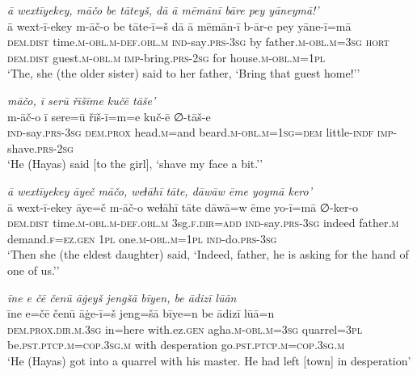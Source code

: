 \ea \label{ŽH.50}
\textit{ā wextīyekey, māčo be tāteyš, dā ā mēmānī bāre pey yāneymā!’} \\ 
\gll ā wext-ī-ekey m-āč-o be tāte-ī=š dā ā mēmān-ī b-ār-e pey yāne-ī=mā \\ 
 \textsc{dem.dist} time\textsc{.m}\textsc{-obl}\textsc{.m}\textsc{-def}\textsc{.obl}\textsc{.m} \textsc{ind-}say\textsc{.prs}\textsc{-3sg} by father\textsc{.m}\textsc{-obl}\textsc{.m}\textsc{=3sg} \textsc{hort} \textsc{dem.dist} guest\textsc{.m}\textsc{-obl}\textsc{.m} \textsc{imp-}bring\textsc{.prs}-\textsc{2sg} for house\textsc{.m}\textsc{-obl}\textsc{.m}\textsc{=1pl} \\ 
\glt `The, she (the older sister) said to her father, ‘Bring that guest home!’'
\z 
 
\ea \label{ŽH.53}
\textit{māčo, ī serū řīšīme kučē tāše’} \\ 
\gll m-āč-o ī sere=ū řīš-ī=m=e kuč-ē ∅-tāš-e \\ 
 \textsc{ind-}say\textsc{.prs}\textsc{-3sg} \textsc{dem.prox} head\textsc{.m}=and beard\textsc{.m}\textsc{-obl}\textsc{.m}\textsc{=1sg}\textsc{=dem} little\textsc{-indf} \textsc{imp-}shave\textsc{.prs}-\textsc{2sg} \\ 
\glt `He (Hayas) said [to the girl], ‘shave my face a bit.’'
\z 
 
\ea \label{ŽH.57}
\textit{ā wextīyekey āyeč māčo, weɫāhī tāte, dāwāw ēme yoymā kero’} \\ 
\gll ā wext-ī-ekey āye=č m-āč-o weɫāhī tāte dāwā=w ēme yo-ī=mā ∅-ker-o \\ 
 \textsc{dem.dist} time\textsc{.m}\textsc{-obl}\textsc{.m}\textsc{-def}\textsc{.obl}\textsc{.m} 3sg\textsc{\textsc{.f}}\textsc{.dir}\textsc{=add} \textsc{ind-}say\textsc{.prs}\textsc{-3sg} indeed father\textsc{.m} demand\textsc{\textsc{.f}}\textsc{=ez}\textsc{.gen} \textsc{1pl} one\textsc{.m}\textsc{-obl}\textsc{.m}\textsc{=1pl} \textsc{ind-}do\textsc{.prs}\textsc{-3sg} \\ 
\glt `Then she (the eldest daughter) said, ‘Indeed, father, he is asking for the hand of one of us.’'
\z 
 
\ea \label{ŽH.62}
\textit{īne e čē čenū āġeyš jengšā bīyen, be ādizī lūān} \\ 
\gll īne e=čē čenū āġe-ī=š jeng=šā bīye=n be ādizī lūā=n \\ 
 \textsc{dem.prox}\textsc{.dir}\textsc{.m}\textsc{.3sg} in=here with.ez\textsc{.gen} agha\textsc{.m}\textsc{-obl}\textsc{.m}\textsc{=3sg} quarrel\textsc{=3pl} be\textsc{.pst}\textsc{.ptcp}\textsc{.m}\textsc{=cop}\textsc{.3sg}\textsc{.m} with desperation go\textsc{.pst}\textsc{.ptcp}\textsc{.m}\textsc{=cop}\textsc{.3sg}\textsc{.m} \\ 
\glt `He (Hayas) got into a quarrel with his master. He had left [town] in desperation'
\z 
 
